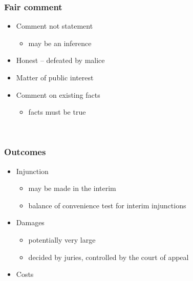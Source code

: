 \documentclass[ignorenonframetext,]{beamer}
\begin{document}
\begin{frame}
\frametitle{Fair comment}

\begin{itemize}
\item  Comment not statement

  \begin{itemize}
  \item    may be an inference
  \end{itemize}
\item  Honest -- defeated by {malice }
\item  {Matter of public interest}
\item  {Comment on existing facts}

  \begin{itemize}
  \item    {facts must be true}
  \end{itemize}
\end{itemize}

~


\end{frame}

\begin{frame}
\frametitle{Outcomes}

\begin{itemize}
\item  Injunction

  \begin{itemize}
  \item    may be made in the interim
  \item    balance of convenience test for interim injunctions
  \end{itemize}
\item  Damages

  \begin{itemize}
  \item    potentially very large
  \item    decided by juries, controlled by the court of appeal
  \end{itemize}
\item  Costs
\end{itemize}

~


\end{frame}
\end{document}
